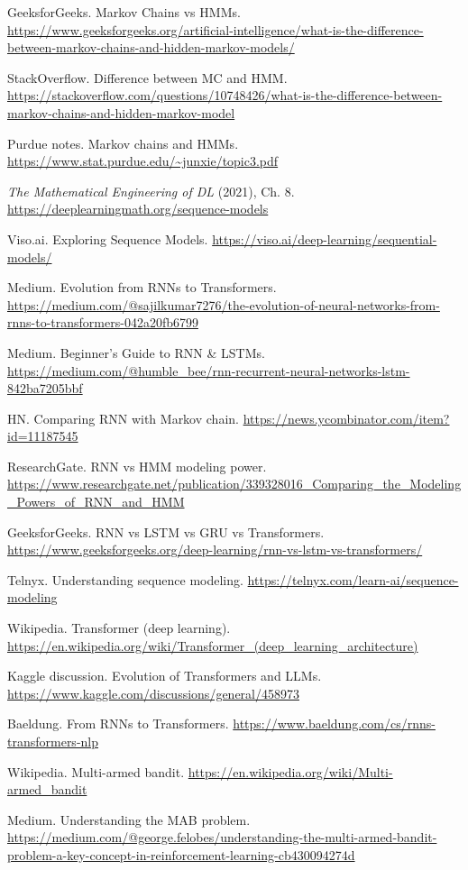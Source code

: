 \documentclass[11pt]{article}
\begin{document}
\begin{enumerate}[leftmargin=1.2em,label={[\arabic*]}]
\item GeeksforGeeks. Markov Chains vs HMMs. \url{https://www.geeksforgeeks.org/artificial-intelligence/what-is-the-difference-between-markov-chains-and-hidden-markov-models/}
\item StackOverflow. Difference between MC and HMM. \url{https://stackoverflow.com/questions/10748426/what-is-the-difference-between-markov-chains-and-hidden-markov-model}
\item Purdue notes. Markov chains and HMMs. \url{https://www.stat.purdue.edu/~junxie/topic3.pdf}
\item \emph{The Mathematical Engineering of DL} (2021), Ch. 8. \url{https://deeplearningmath.org/sequence-models}
\item Viso.ai. Exploring Sequence Models. \url{https://viso.ai/deep-learning/sequential-models/}
\item Medium. Evolution from RNNs to Transformers. \url{https://medium.com/@sajilkumar7276/the-evolution-of-neural-networks-from-rnns-to-transformers-042a20fb6799}
\item Medium. Beginner's Guide to RNN \& LSTMs. \url{https://medium.com/@humble_bee/rnn-recurrent-neural-networks-lstm-842ba7205bbf}
\item HN. Comparing RNN with Markov chain. \url{https://news.ycombinator.com/item?id=11187545}
\item ResearchGate. RNN vs HMM modeling power. \url{https://www.researchgate.net/publication/339328016_Comparing_the_Modeling_Powers_of_RNN_and_HMM}
\item GeeksforGeeks. RNN vs LSTM vs GRU vs Transformers. \url{https://www.geeksforgeeks.org/deep-learning/rnn-vs-lstm-vs-transformers/}
\item Telnyx. Understanding sequence modeling. \url{https://telnyx.com/learn-ai/sequence-modeling}
\item Wikipedia. Transformer (deep learning). \url{https://en.wikipedia.org/wiki/Transformer_(deep_learning_architecture)}
\item Kaggle discussion. Evolution of Transformers and LLMs. \url{https://www.kaggle.com/discussions/general/458973}
\item Baeldung. From RNNs to Transformers. \url{https://www.baeldung.com/cs/rnns-transformers-nlp}
\item Wikipedia. Multi-armed bandit. \url{https://en.wikipedia.org/wiki/Multi-armed_bandit}
\item Medium. Understanding the MAB problem. \url{https://medium.com/@george.felobes/understanding-the-multi-armed-bandit-problem-a-key-concept-in-reinforcement-learning-cb430094274d}

\end{enumerate}
\end{document}
